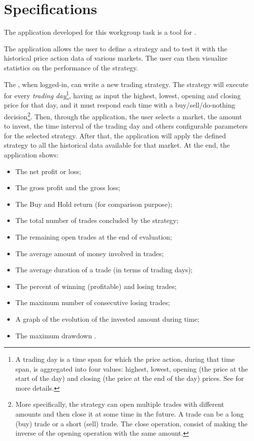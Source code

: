 \chapter{Specifications}\label{ch:specs}

The application developed for this workgroup task is a tool for
.

The application allows the user to define a strategy and to test it with the
historical price action data of various markets. The user can then visualize
statistics on the performance of the strategy.

The , when logged-in, can write a new trading strategy. The
strategy will execute for every \emph{trading day}\footnote{A trading day is a
time span for which the price action, during that time span, is aggregated into
four values: highest, lowest, opening (the price at the start of the day) and
closing (the price at the end of the day) prices. See
 for more details.}, having as input the highest,
lowest, opening and closing price for that day, and it must respond each time
with a buy/sell/do-nothing decision\footnote{More specifically, the strategy can
open multiple trades with different amounts and then close it at some time in
the future. A trade can be a long (buy) trade or a short (sell) trade. The close
operation, consist of making the inverse of the opening operation with the same
amount.}. Then, through the application, the user selects a market, the amount
to invest, the time interval of the trading day and others configurable
parameters for the selected strategy. After that, the application will apply the
defined strategy to all the historical data available for that market. At the
end, the application shows:
\begin{itemize}
	\item The net profit or loss;
	\item The gross profit  and the gross loss;
	\item The Buy and Hold return (for comparison purpose);
	\item The total number of trades concluded by the strategy;
	\item The remaining open trades at the end of evaluation;
	\item The average amount of money involved in trades;
	\item The average duration of a trade (in terms of trading days);
	\item The percent of winning (profitable) and losing trades;
	\item The maximum number of consecutive losing trades;
	\item A graph of the evolution of the invested amount during time;
	\item The maximum drawdown .
\end{itemize}

